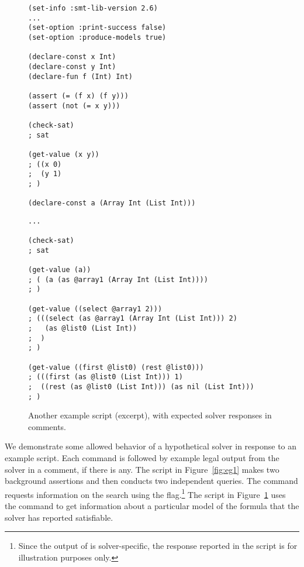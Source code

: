 \begin{figure}
\footnotesize
\begin{minipage}[t]{.45\linewidth}
\begin{verbatim}
(set-info :smt-lib-version 2.6)
...
(set-option :print-success false)
(set-option :produce-models true)

(declare-const x Int)
(declare-const y Int)
(declare-fun f (Int) Int)

(assert (= (f x) (f y)))
(assert (not (= x y)))

(check-sat)
; sat

(get-value (x y))
; ((x 0)
;  (y 1)
; )

(declare-const a (Array Int (List Int)))
\end{verbatim}
\end{minipage}
%
\begin{minipage}[t]{.5\linewidth}
\begin{verbatim}
...

(check-sat)
; sat

(get-value (a))
; ( (a (as @array1 (Array Int (List Int))))
; )

(get-value ((select @array1 2)))
; (((select (as @array1 (Array Int (List Int))) 2) 
;   (as @list0 (List Int))
;  )
; )

(get-value ((first @list0) (rest @list0)))
; (((first (as @list0 (List Int))) 1)
;  ((rest (as @list0 (List Int))) (as nil (List Int)))
; )
\end{verbatim}
\end{minipage}
\medskip

\caption{\label{fig:eg2}
Another example script (excerpt), with expected solver responses in comments.
}
\end{figure}

We demonstrate some allowed behavior of a hypothetical solver in response
to an example script.  Each command is followed by example legal
output from the solver in a comment, if there is any.  The script in
Figure~\ref{fig:eg1} makes two background assertions and then
conducts two independent queries.  The  command requests
information on the search using the  flag.\footnote{%
Since the output of  is solver-specific,
the response reported in the script is for illustration purposes only.
}
The script in Figure~\ref{fig:eg2} uses
the  command to get information about a particular
model of the formula that the solver has reported satisfiable.


